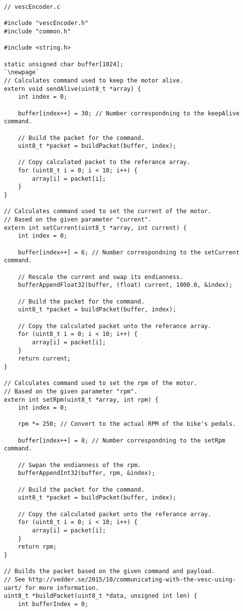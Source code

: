 \begin{lstlisting}[escapeinside=``]
// vescEncoder.c

#include "vescEncoder.h"
#include "common.h"

#include <string.h>

static unsigned char buffer[1024];
`\newpage`
// Calculates command used to keep the motor alive.
extern void sendAlive(uint8_t *array) {
    int index = 0;

    buffer[index++] = 30; // Number correspondning to the keepAlive command.

    // Build the packet for the command.
    uint8_t *packet = buildPacket(buffer, index);

    // Copy calculated packet to the referance array.
	for (uint8_t i = 0; i < 10; i++) {
        array[i] = packet[i];
    }
}

// Calculates command used to set the current of the motor.
// Based on the given parameter "current".
extern int setCurrent(uint8_t *array, int current) {
	int index = 0;

	buffer[index++] = 6; // Number correspondning to the setCurrent command.

    // Rescale the current and swap its endianness.
	bufferAppendFloat32(buffer, (float) current, 1000.0, &index);

    // Build the packet for the command.
    uint8_t *packet = buildPacket(buffer, index);

    // Copy the calculated packet unto the referance array.
	for (uint8_t i = 0; i < 10; i++) {
        array[i] = packet[i];
    }
	return current;
}

// Calculates command used to set the rpm of the motor.
// Based on the given parameter "rpm".
extern int setRpm(uint8_t *array, int rpm) {
    int index = 0;

    rpm *= 250; // Convert to the actual RPM of the bike's pedals.

    buffer[index++] = 8; // Number correspondning to the setRpm command.

    // Swpan the endianness of the rpm.
    bufferAppendInt32(buffer, rpm, &index);
 
    // Build the packet for the command.
    uint8_t *packet = buildPacket(buffer, index);

    // Copy the calculated packet unto the referance array.
    for (uint8_t i = 0; i < 10; i++) {
        array[i] = packet[i];
    }
    return rpm;
}

// Builds the packet based on the given command and payload.
// See http://vedder.se/2015/10/communicating-with-the-vesc-using-uart/ for more information.
uint8_t *buildPacket(uint8_t *data, unsigned int len) {
    int bufferIndex = 0;


\end{lstlisting}
